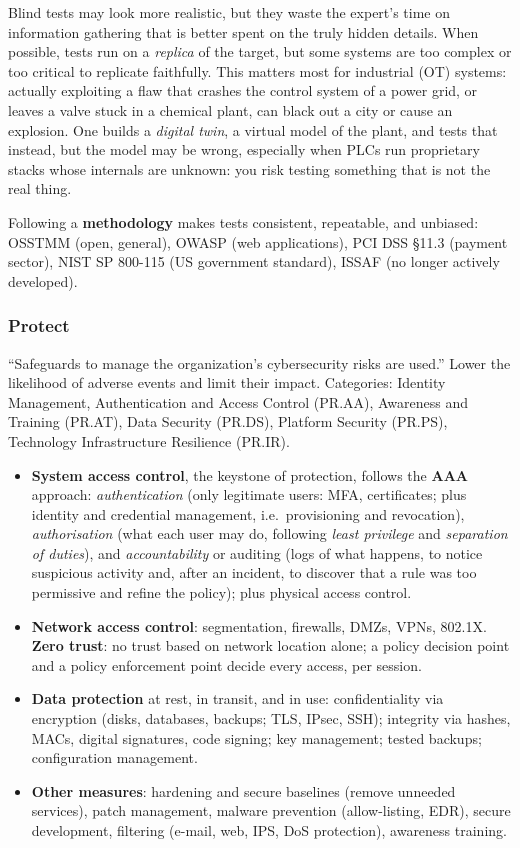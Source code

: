 \begin{remark}
Blind tests may look more realistic, but they waste the expert's time on information gathering that is better spent on the truly hidden details. When possible, tests run on a \emph{replica} of the target, but some systems are too complex or too critical to replicate faithfully. This matters most for industrial (OT) systems: actually exploiting a flaw that crashes the control system of a power grid, or leaves a valve stuck in a chemical plant, can black out a city or cause an explosion. One builds a \emph{digital twin}, a virtual model of the plant, and tests that instead, but the model may be wrong, especially when PLCs run proprietary stacks whose internals are unknown: you risk testing something that is not the real thing.
\end{remark}

Following a \textbf{methodology} makes tests consistent, repeatable, and unbiased: OSSTMM (open, general), OWASP (web applications), PCI DSS \S11.3 (payment sector), NIST SP 800-115 (US government standard), ISSAF (no longer actively developed).

\subsubsection{Protect}
\enquote{Safeguards to manage the organization's cybersecurity risks are used.} Lower the likelihood of adverse events and limit their impact. Categories: Identity Management, Authentication and Access Control (PR.AA), Awareness and Training (PR.AT), Data Security (PR.DS), Platform Security (PR.PS), Technology Infrastructure Resilience (PR.IR).
\begin{itemize}
    \item \textbf{System access control}, the keystone of protection, follows the \textbf{AAA} approach: \emph{authentication} (only legitimate users: MFA, certificates; plus identity and credential management, i.e.\ provisioning and revocation), \emph{authorisation} (what each user may do, following \emph{least privilege} and \emph{separation of duties}), and \emph{accountability} or auditing (logs of what happens, to notice suspicious activity and, after an incident, to discover that a rule was too permissive and refine the policy); plus physical access control.
    \item \textbf{Network access control}: segmentation, firewalls, DMZs, VPNs, 802.1X. \textbf{Zero trust}: no trust based on network location alone; a policy decision point and a policy enforcement point decide every access, per session.
    \item \textbf{Data protection} at rest, in transit, and in use: confidentiality via encryption (disks, databases, backups; TLS, IPsec, SSH); integrity via hashes, MACs, digital signatures, code signing; key management; tested backups; configuration management.
    \item \textbf{Other measures}: hardening and secure baselines (remove unneeded services), patch management, malware prevention (allow-listing, EDR), secure development, filtering (e-mail, web, IPS, DoS protection), awareness training.
\end{itemize}

